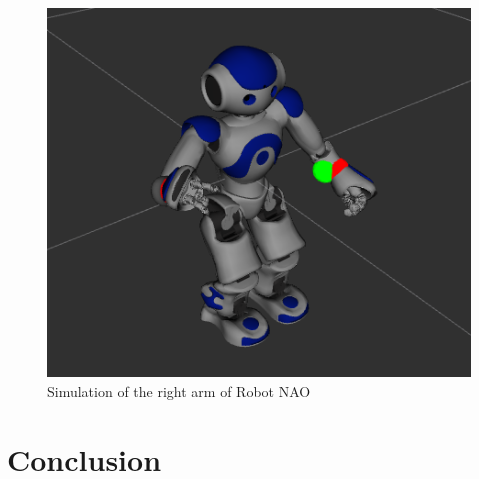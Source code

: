 \documentclass[conference]{IEEEtran}
\begin{document}
\begin{figure}
\centering
\includegraphics[scale=0.3]{nao1.png}
\caption{Simulation of the right arm of Robot NAO}
\end{figure}
\section{Conclusion}
\label{sec:conclusion}



\end{document}
